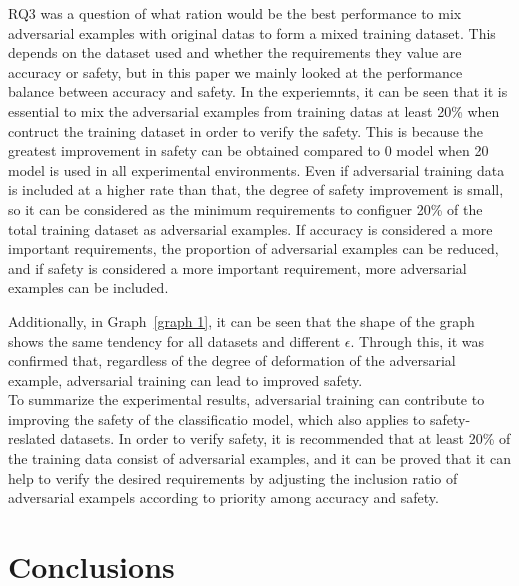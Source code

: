 \documentclass[journal,article,submit,moreauthors,pdftex]{Definitions/mdpi}
\begin{document}
RQ3 was a question of what ration would be the best performance to mix adversarial examples with original datas to form a mixed training dataset.
This depends on the dataset used and whether the requirements they value are accuracy or safety, but in this paper we mainly looked at the performance balance between accuracy and safety.
In the experiemnts, it can be seen that it is essential to mix the adversarial examples from training datas at least 20\% when contruct the training dataset in order to verify the safety.
This is because the greatest improvement in safety can be obtained compared to 0 model when 20 model is used in all experimental environments.
Even if adversarial training data is included at a higher rate than that, the degree of safety improvement is small, so it can be considered as the minimum requirements to configuer 20\% of the total training dataset as adversarial examples.
If accuracy is considered a more important requirements, the proportion of adversarial examples can be reduced, and if safety is considered a more important requirement, more adversarial examples can be included.

Additionally, in Graph~\ref{graph 1}, it can be seen that the shape of the graph shows the same tendency for all datasets and different \begin{math}\epsilon\end{math}.
Through this, it was confirmed that, regardless of the degree of deformation of the adversarial example, adversarial training can lead to improved safety. \\

To summarize the experimental results, adversarial training can contribute to improving the safety of the classificatio model, which also applies to safety-reslated datasets.
In order to verify safety, it is recommended that at least 20\% of the training data consist of adversarial examples, and it can be proved that it can help to verify the desired requirements by adjusting the inclusion ratio of adversarial exampels according to priority among accuracy and safety.

\section{Conclusions}
\end{document}
